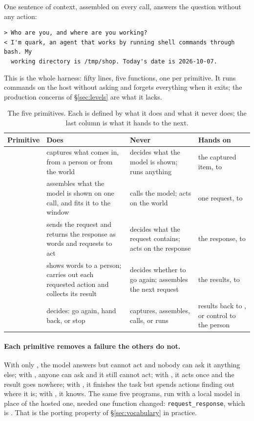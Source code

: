 
One sentence of context, assembled on every call, answers the question without any action:
\begin{lstlisting}[language={},basicstyle=\ttfamily\scriptsize,breaklines=true,breakindent=1.5em,frame=none,commentstyle=\ttfamily,keywordstyle=\ttfamily,stringstyle=\ttfamily]
> Who are you, and where are you working?
< I'm quark, an agent that works by running shell commands through bash. My
  working directory is /tmp/shop. Today's date is 2026-10-07.
\end{lstlisting}
This is the whole harness: fifty lines, five functions, one per primitive. It runs commands on the host without asking and forgets everything when it exits; the production concerns of \S\ref{sec:levels} are what it lacks.

\begin{table}[t]
\centering
\small
\caption{The five primitives. Each is defined by what it does and what it never does; the last column is what it hands to the next.}
\label{tab:primitives}
\begin{tabularx}{\linewidth}{@{}lYYY@{}}
\toprule
Primitive & Does & Never & Hands on \\
\midrule
{} & captures what comes in, from a person or from the world & decides what the model is shown; runs anything & the captured item, to  \\
 & assembles what the model is shown on one call, and fits it to the window & calls the model; acts on the world & one request, to  \\
 & sends the request and returns the response as words and requests to act & decides what the request contains; acts on the response & the response, to  \\
 & shows words to a person; carries out each requested action and collects its result & decides whether to go again; assembles the next request & the results, to  \\
 & decides: go again, hand back, or stop & captures, assembles, calls, or runs & results back to , or control to the person \\
\bottomrule
\end{tabularx}
\end{table}

\paragraph{Each primitive removes a failure the others do not.} With only , the model answers but cannot act and nobody can ask it anything else; with , anyone can ask and it still cannot act; with , it acts once and the result goes nowhere; with , it finishes the task but spends actions finding out where it is; with , it knows. The same five programs, run with a local model in place of the hosted one, needed one function changed: \texttt{request\_response}, which is . That is the porting property of \S\ref{sec:vocabulary} in practice.
